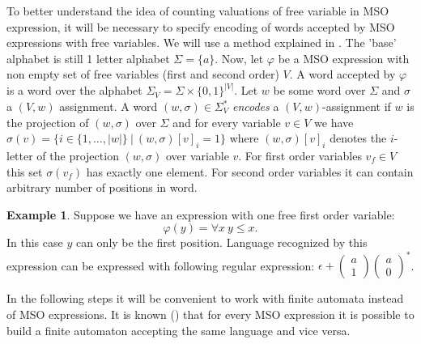 \documentclass[12pt]{article}
\newcommand{\icol}[1]{%
  \left(\begin{smallmatrix}#1\end{smallmatrix}\right)%
}
\theoremstyle{definition}
\newtheorem{example}{Example}[section]
\begin{document}
To better understand the idea of counting valuations of free variable in MSO expression, it will be necessary to specify encoding of words accepted by MSO expressions with free variables. We will use a method explained in \cite{KreutzerR13}. The 'base' alphabet is still 1 letter alphabet $\Sigma = \{a\}$. Now, let $\varphi$ be a MSO expression with non empty set of free variables (first and second order) $V$. A word accepted by $\varphi$ is a word over the alphabet $\Sigma_V = \Sigma \times \{0, 1\}^{|V|}$. Let $w$ be some word over $\Sigma$ and $\sigma$ a $(V, w)$ assignment. A word $(w, \sigma) \in \Sigma_V^*$ \textit{encodes} a $(V, w)$-assignment if $w$ is the projection of $(w, \sigma)$ over $\Sigma$ and for every variable $v \in V$ we have $\sigma(v) = \{i \in \{1,\ldots,|w|\} \ | \ (w, \sigma)[v]_i = 1 \}$ where $(w, \sigma)[v]_i$ denotes the $i$-letter of the projection $(w, \sigma)$ over variable $v$. For first order variables $v_f \in V$ this set $\sigma(v_f)$ has exactly one element. For second order variables it can contain arbitrary number of positions in word.

\begin{example}
    Suppose we have an expression with one free first order variable:
    $$\varphi(y) = \forall x \ y \leq x.$$
    In this case $y$ can only be the first position. Language recognized by this expression can be expressed with following regular expression: $\epsilon + \icol{a\\1}\icol{a\\0}^*$.
\end{example}

In the following steps it will be convenient to work with finite automata instead of MSO expressions. It is known (\cite{Buchi1960}) that for every MSO expression it is possible to build a finite automaton accepting the same language and vice versa.
\end{document}

